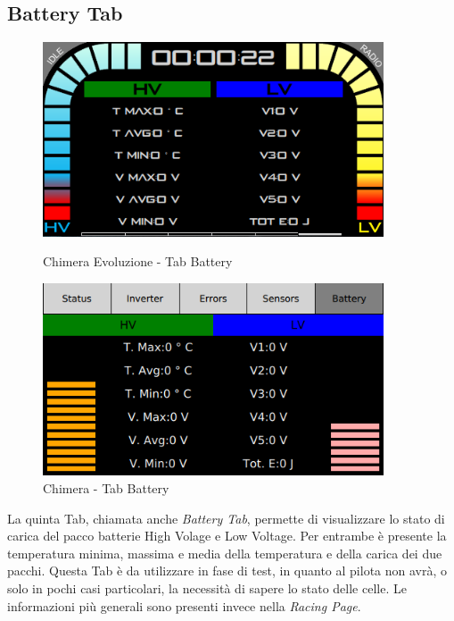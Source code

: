 \subsection{Battery Tab}

\begin{figure}[h!]
    \centering
    \begin{minipage}{0.5\textwidth}
        \centering
        \includegraphics[width=0.9\textwidth]{./figures/UI/tabBattery.png}
        \caption{Chimera Evoluzione - Tab Battery}    
    \end{minipage}\hfill
    \begin{minipage}{0.5\textwidth}
        \centering
        \includegraphics[width=0.9\textwidth]{./figures/oldUI/tabBattery.png}
        \caption{Chimera - Tab Battery}
    \end{minipage}
\end{figure}

La quinta Tab, chiamata anche \emph{Battery Tab}, permette di visualizzare lo stato di carica del pacco batterie High Volage e Low Voltage.
Per entrambe è presente la temperatura minima, massima e media della temperatura e della carica dei due pacchi.
Questa Tab è da utilizzare in fase di test, in quanto al pilota non avrà, o solo in pochi casi particolari, 
la necessità di sapere lo stato delle celle. Le informazioni più generali sono presenti invece nella \emph{Racing Page}.  


